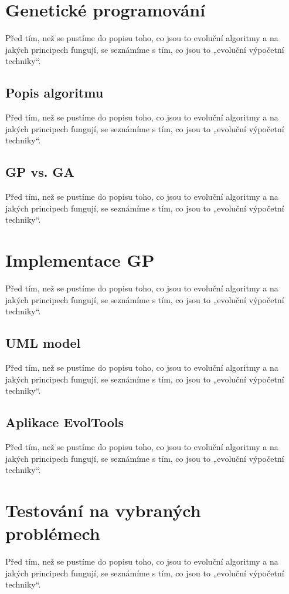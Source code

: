 \documentclass[bc,male,java,dept460]{diploma}		%
\begin{document}
\section{Genetické programování}
Před tím, než se pustíme do popisu toho, co jsou to evoluční algoritmy a na jakých principech fungují, se seznámíme s tím, co jsou to „evoluční výpočetní techniky“.

\subsection{Popis algoritmu}
Před tím, než se pustíme do popisu toho, co jsou to evoluční algoritmy a na jakých principech fungují, se seznámíme s tím, co jsou to „evoluční výpočetní techniky“.

\subsection{GP vs. GA}
Před tím, než se pustíme do popisu toho, co jsou to evoluční algoritmy a na jakých principech fungují, se seznámíme s tím, co jsou to „evoluční výpočetní techniky“.

\section{Implementace GP}
Před tím, než se pustíme do popisu toho, co jsou to evoluční algoritmy a na jakých principech fungují, se seznámíme s tím, co jsou to „evoluční výpočetní techniky“.

\subsection{UML model}
Před tím, než se pustíme do popisu toho, co jsou to evoluční algoritmy a na jakých principech fungují, se seznámíme s tím, co jsou to „evoluční výpočetní techniky“.

\subsection{Aplikace EvolTools}
Před tím, než se pustíme do popisu toho, co jsou to evoluční algoritmy a na jakých principech fungují, se seznámíme s tím, co jsou to „evoluční výpočetní techniky“.

\section{Testování na vybraných problémech}
Před tím, než se pustíme do popisu toho, co jsou to evoluční algoritmy a na jakých principech fungují, se seznámíme s tím, co jsou to „evoluční výpočetní techniky“.
\end{document}
